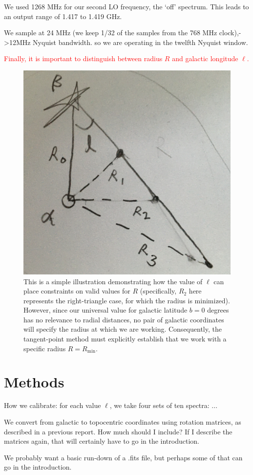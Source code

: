 \documentclass[12pt]{article}
\begin{document}
We used 1268 MHz for our second LO frequency, the `off' spectrum. This leads to an output range of 1.417 to 1.419 GHz.

We sample at 24 MHz (we keep 1/32 of the samples from the 768 MHz clock),->12MHz Nyquist bandwidth. so we are operating in the twelfth Nyquist window.

\textcolor{red}{Finally, it is important to distinguish between radius $R$ and galactic longitude $\ell$.}

\begin{figure}
	\centering
	\includegraphics[width=.4\linewidth]{ell_versus_r}
	\caption{This is a simple illustration demonstrating how the value of $\ell$ can place constraints on valid values for $R$ (specifically, $R_2$ here represents the right-triangle case, for which the radius is minimized). However, since our universal value for galactic latitude $b = 0$ degrees has no relevance to radial distances, no pair of galactic coordinates will specify the radius at which we are working. Consequently, the tangent-point method must explicitly establish that we work with a specific radius $R = R_\text{min}$.}
	\label{fig:ell_vs_r}
\end{figure}

\section{Methods}

\quad \quad How we calibrate: for each value $\ell$, we take four sets of ten spectra: ...

We convert from galactic to topocentric coordinates using rotation matrices, as described in a previous report. How much should I include? If I describe the matrices again, that will certainly have to go in the introduction.

We probably want a basic run-down of a .fits file, but perhaps some of that can go in the introduction.
\end{document}
